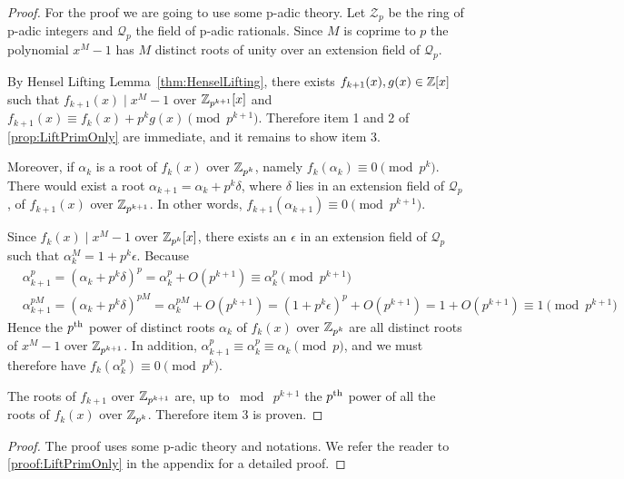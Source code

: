 \ifFullVersion
\begin{proof}
    For the proof we are going to use some p-adic theory. Let \(\mathcal{Z}_p\) be the ring of p-adic integers and \(\mathcal{Q}_p\) the field of p-adic rationals. Since \(M\) is coprime to \(p\) the polynomial \(x^M - 1\) has \(M\) distinct roots of unity over an extension field of \(\mathcal{Q}_p\).

    By Hensel Lifting Lemma~\cref{thm:HenselLifting}, there exists \(f_{k+1}(x), g(x) \in \mathbb{Z}[x]\) such that \(f_{k+1}(x) \mid x^M - 1\) over \(\mathbb{Z}_{p^{k+1}}[x]\) and \(f_{k+1}(x) \equiv f_k(x) + p^k g(x) \pmod{p^{k+1}}\). Therefore item 1 and 2 of \cref{prop:LiftPrimOnly} are immediate, and it remains to show item 3.

    Moreover, if \(\alpha_k\) is a root of \(f_k(x)\) over \(\mathbb{Z}_{p^k}\), namely \(f_k(\alpha_k) \equiv 0 \pmod{p^k}\). There would exist a root \(\alpha_{k+1} = \alpha_k + p^k \delta\), where \(\delta\) lies in an extension field of \(\mathcal{Q}_p\), of \(f_{k+1}(x)\) over \(\mathbb{Z}_{p^{k+1}}\). In other words, \(f_{k+1}(\alpha_{k+1}) \equiv 0 \pmod{p^{k+1}}\).

    Since \(f_k(x) \mid x^M - 1\) over \(\mathbb{Z}_{p^k}[x]\), there exists an \(\epsilon\) in an extension field of \(\mathcal{Q}_p\) such that \(\alpha_k^M = 1 + p^k \epsilon\). Because
    \begin{align*}
        &\alpha_{k+1}^p = (\alpha_k + p^k \delta)^p = \alpha_k^p + O(p^{k+1}) \equiv \alpha_k^p \pmod{p^{k+1}} \\
        &\alpha_{k+1}^{pM} = (\alpha_k + p^k \delta)^{pM} = \alpha_k^{pM} + O(p^{k+1}) = (1 + p^k \epsilon)^p + O(p^{k+1}) = 1 + O(p^{k+1}) \equiv 1 \pmod{p^{k+1}}
    \end{align*}
    Hence the \(p\textsuperscript{th}\) power of distinct roots \(\alpha_k\) of \(f_k(x)\) over \(\mathbb{Z}_{p^k}\) are all distinct roots of \(x^M - 1\) over \(\mathbb{Z}_{p^{k+1}}\). In addition, \(\alpha_{k+1}^p \equiv \alpha_k^p \equiv \alpha_k \pmod{p}\), and we must therefore have \(f_k(\alpha_k^p) \equiv 0 \pmod{p^k}\).

    The roots of \(f_{k+1}\) over \(\mathbb{Z}_{p^{k+1}}\) are, up to \(\bmod \  p^{k+1}\) the \(p\textsuperscript{th}\) power of all the roots of \(f_k(x)\) over \(\mathbb{Z}_{p^k}\). Therefore item 3 is proven.
\end{proof}
\else
\begin{proof}
    The proof uses some p-adic theory and notations. We refer the reader to \cref{proof:LiftPrimOnly} in the appendix for a detailed proof.
\end{proof}
\fi

